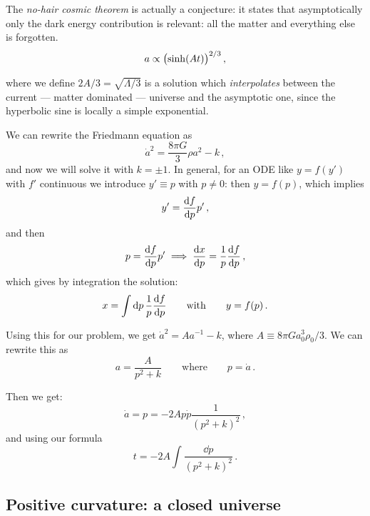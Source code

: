 \documentclass[main.tex]{subfiles}
\begin{document}
The \emph{no-hair cosmic theorem} is actually a conjecture: it states that asymptotically only the dark energy contribution is relevant: all the matter and everything else is forgotten. 
%
\begin{equation}
  a \propto \qty(\sinh(At))^{2/3}
\,,
\end{equation}
%

where we define \(2A/3 = \sqrt{\Lambda /3} \) is a solution which \emph{interpolates} between the current --- matter dominated --- universe and the asymptotic one, since the hyperbolic sine is locally a simple exponential.

We can rewrite the Friedmann equation as 
%
\begin{equation}
  \dot{a}^2 = \frac{8 \pi G}{3} \rho a^2 - k
\,,
\end{equation}
%
and now we will solve it with \(k = \pm 1\).
In general, for an ODE like \(y = f(y')\) with \(f'\) continuous we introduce \(y' \equiv p\) with \(p \neq 0\): then \(y = f(p)\), which implies 
%
\begin{equation}
  y' = \dv{f}{p} p'
\,,
\end{equation}
%
and then 
%
\begin{equation}
  p = \dv{f}{p} p' \implies \dv{x}{p} = \frac{1}{p} \dv{f}{p}
\,,
\end{equation}
%
which gives by integration the solution: 
%
\begin{equation}
  x = \int  \dd{p} \frac{1}{p} \dv{f}{p}
  \qquad \text{with} \qquad
  y = f(p)
\,.
\end{equation}

Using this for our problem, we get \(\dot{a}^2 = A a^{-1} - k \), where \(A \equiv 8 \pi G a_0^3 \rho_0 /3\). We can rewrite this as 
%
\begin{equation}
  a = \frac{A}{p^2+k} 
  \qquad \text{where} \qquad
  p = \dot{a} 
\,.
\end{equation}

Then we get: 
%
\begin{equation}
  \dot{a} = p = -2A  p \dot{p} \frac{1}{(p^2+k)^2}
\,,
\end{equation}
%
and using our formula 
%
\begin{equation}
  t = -2A \int \frac{\dd{p} }{(p^2+k)^2}
\,.
\end{equation}

\subsection{Positive curvature: a closed universe}
\end{document}
